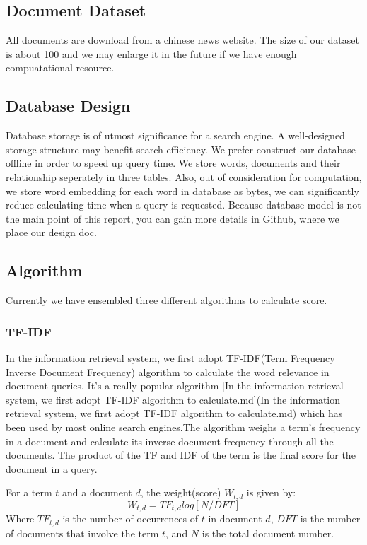 \documentclass[UTF8]{article}
\begin{document}
	
	\subsection{Document Dataset}
	All documents are download from a chinese news website. The size of our dataset is about 100 and we may enlarge it in the future if we have enough compuatational resource.
	
	
	\subsection{Database Design}
	Database storage is of utmost significance for a search engine. A well-designed storage structure may benefit search efficiency. We prefer construct our database offline in order to speed up query time. We store words, documents and their relationship seperately in three tables. Also, out of consideration for computation, we store word embedding for each word in database as bytes, we can significantly reduce calculating time when a query is requested.
   Because database model is not the main point of this report, you can gain more details in Github, where we place our design doc.
	
	\subsection{Algorithm}
	Currently we have ensembled three different algorithms to calculate score.
	
	\subsubsection{TF-IDF}
	In the information retrieval system, we first adopt TF-IDF(Term Frequency Inverse Document Frequency) algorithm to calculate the word relevance in document queries. It's a really popular algorithm  [In the information retrieval system, we first adopt TF-IDF algorithm to calculate.md](In the information retrieval system, we first adopt TF-IDF algorithm to calculate.md) which has been used by most online search engines.The algorithm weighs a term's frequency in a document and calculate its inverse document frequency through all the documents. The product of the TF and IDF of the term is the final score for the document in a query.
	
	For a term $t$ and a document $d$, the weight(score) $W_{t,d}$ is given by:
	\[ W_{t,d} = TF_{t,d}log[N/DFT] \]
	Where $TF_{t,d}$ is the number of occurrences of $t$ in document $d$, $DFT$ is the number of documents that involve the term $t$, and $N$ is the total document number.
	
\end{document}
